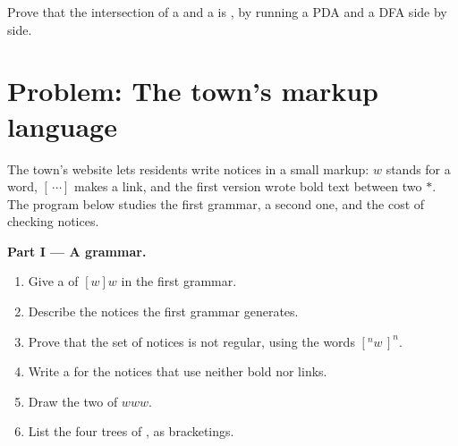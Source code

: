 \begin{exercise}[$\star\star\star$]\label{exo:b2:context-free-languages:12}
Prove that the intersection of a  and a  is , by running a PDA and a
DFA side by side.
\end{exercise}

\section{Problem: The town's markup language}\label{sec:b2:context-free-languages:problem}

\begin{problem}\label{pb:b2:context-free-languages:1}
The town's website lets residents write notices in a small markup: $w$ stands for a word, $[\,\cdots]$ makes a link,
and the first version wrote bold text between two $*$. The program below studies the first grammar, a second one, and
the cost of checking notices.

\label{out:b2:context-free-languages:markup}

\medskip\noindent\textbf{Part I --- A grammar.}\par\nopagebreak
\begin{enumerate}
\item Give a  of $[w]w$ in the first grammar.
\item Describe the notices the first grammar generates.
\item Prove that the set of notices is not regular, using the words $[^n w\, ]^n$.
\item Write a  for the notices that use neither bold nor links.
\item Draw the two  of $www$.
\item List the four trees of , as bracketings.
\end{enumerate}


\end{problem}
